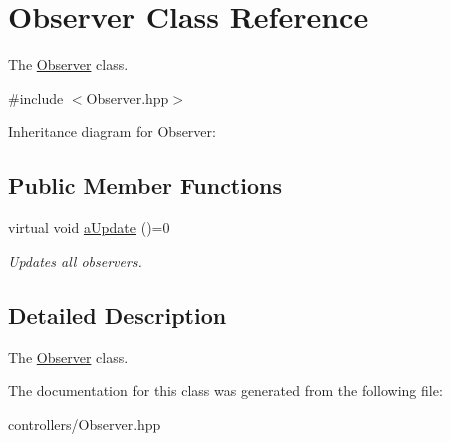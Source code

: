 \hypertarget{class_observer}{}\section{Observer Class Reference}
\label{class_observer}


The \hyperlink{class_observer}{Observer} class.  




{\ttfamily \#include $<$Observer.\+hpp$>$}



Inheritance diagram for Observer\+:
\subsection*{Public Member Functions}
\begin{DoxyCompactItemize}
\item 
\mbox{\label{class_observer_a4e2730c8de7a293f488c5faccf08ec56}} 
virtual void \hyperlink{class_observer_a4e2730c8de7a293f488c5faccf08ec56}{a\+Update} ()=0
\begin{DoxyCompactList}\small\item\em Updates all observers. \end{DoxyCompactList}\end{DoxyCompactItemize}


\subsection{Detailed Description}
The \hyperlink{class_observer}{Observer} class. 

The documentation for this class was generated from the following file\+:\begin{DoxyCompactItemize}
\item 
controllers/Observer.\+hpp\end{DoxyCompactItemize}
